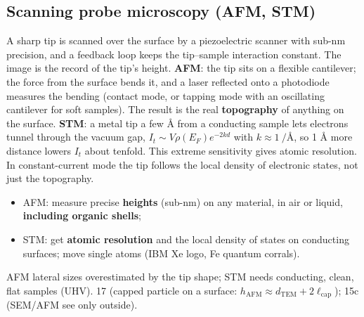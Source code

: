 \subsection{Scanning probe microscopy (AFM, STM)}
{A sharp tip is scanned over the surface by a piezoelectric scanner with sub-nm precision, and a feedback loop keeps the tip--sample
interaction constant. The image is the record of the tip's height. \textbf{AFM}: the tip sits on a flexible cantilever; the force
from the surface bends it, and a laser reflected onto a photodiode measures the bending (contact mode, or tapping mode with an
oscillating cantilever for soft samples). The result is the real \textbf{topography} of anything on the surface. \textbf{STM}: a
metal tip a few \AA{} from a conducting sample lets electrons tunnel through the vacuum gap, $I_t\sim V\rho(E_F)e^{-2kd}$ with
$k\approx\SI{1}{\per\angstrom}$, so 1 \AA{} more distance lowers $I_t$ about tenfold. This extreme sensitivity gives atomic
resolution. In constant-current mode the tip follows the local density of electronic states, not just the topography.}
{\begin{itemize}
 \item AFM: measure precise \textbf{heights} (sub-nm) on any material, in air or liquid, \textbf{including organic shells};
 \item STM: get \textbf{atomic resolution} and the local density of states on conducting surfaces; move single atoms (IBM Xe logo,
       Fe quantum corrals).
\end{itemize}}
{AFM lateral sizes overestimated by the tip shape; STM needs conducting, clean, flat samples (UHV).}
{17 (capped particle on a surface: $h_\mathrm{AFM}\approx d_\mathrm{TEM}+2\ell_\mathrm{cap}$); 15c (SEM/AFM see only outside).}

